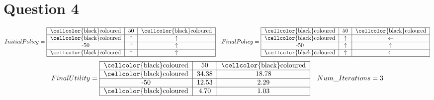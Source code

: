 \documentclass[letter, 10pt]{article}
\begin{document}
\section*{Question 4}
\begin{equation*}
    Initial Policy = \begin{tabular}{ |c|c|c| } 
                    \hline
                    \cellcolor{black}coloured & 50 & \cellcolor{black}coloured\\
                    \hline
                    \cellcolor{black}coloured & $\uparrow$ & $\uparrow$\\
                    \hline
                    -50 & $\uparrow$ & $\uparrow$\\
                    \hline
                    \cellcolor{black}coloured & $\uparrow$ & $\uparrow$\\
                    \hline
                    \end{tabular}\quad 
    Final Policy =   \begin{tabular}{ |c|c|c| } 
                    \hline
                    \cellcolor{black}coloured & 50 & \cellcolor{black}coloured\\
                    \hline
                    \cellcolor{black}coloured & $\uparrow$ & $\leftarrow$\\
                    \hline
                    -50 & $\uparrow$ & $\uparrow$\\
                    \hline
                    \cellcolor{black}coloured & $\uparrow$ & $\leftarrow$\\
                    \hline
                    \end{tabular}
\end{equation*}
\begin{equation*}
    Final Utility = \begin{tabular}{ |c|c|c| } 
                    \hline
                    \cellcolor{black}coloured & 50 & \cellcolor{black}coloured\\
                    \hline
                    \cellcolor{black}coloured & 34.38 & 18.78\\
                    \hline
                    -50 & 12.53 & 2.29\\
                    \hline
                    \cellcolor{black}coloured & 4.70 & 1.03\\
                    \hline
                    \end{tabular}\quad Num\_Iterations = 3
\end{equation*}
\end{document}
